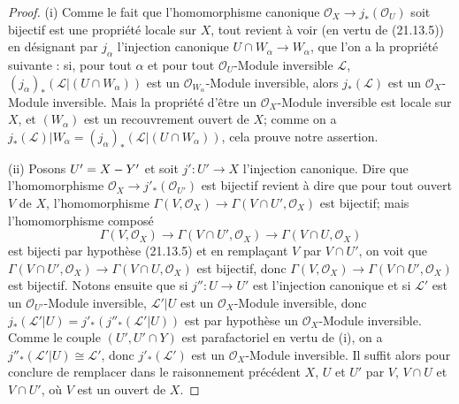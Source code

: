 \begin{proof}
(i) Comme le fait que l'homomorphisme canonique
$\mathcal O_X\to j_*(\mathcal O_U)$ soit bijectif est une propriété locale sur $X$,
tout revient à voir (en vertu de (21.13.5)) en désignant par
$j_\alpha$ l'injection canonique $U\cap W_\alpha\to W_\alpha$, que l'on a la propriété
suivante : si, pour tout $\alpha$ et pour tout $\mathcal O_U$-Module inversible
$\mathscr L$, $(j_\alpha)_*(\mathscr L|(U\cap W_\alpha))$ est un
$\mathcal O_{W_\alpha}$-Module inversible, alors $j_*(\mathscr L)$ est un
$\mathcal O_X$-Module inversible. Mais la propriété d'être un $\mathcal O_X$-Module
inversible est locale sur $X$, et $(W_\alpha)$ est un recouvrement ouvert de $X$;
comme on a
$j_*(\mathscr L)|W_\alpha=(j_\alpha)_*(\mathscr L|(U\cap W_\alpha))$, cela prouve notre assertion.

(ii) Posons $U'=X- Y'$ et soit $j':U'\to X$ l'injection canonique. Dire que
l'homomorphisme $\mathcal O_X\to j'_*(\mathcal O_{U'})$ est bijectif revient à dire
que pour tout ouvert $V$ de $X$, l'homomorphisme
$\Gamma(V,\mathcal O_X)\to\Gamma(V\cap U',\mathcal O_X)$ est bijectif; mais
l'homomorphisme composé
\[
  \Gamma(V,\mathcal O_X)\longrightarrow\Gamma(V\cap U',\mathcal O_X)
  \longrightarrow\Gamma(V\cap U,\mathcal O_X)
\]
est bijecti par hypothèse (21.13.5) et en remplaçant $V$ par $V\cap U'$, on voit que
$\Gamma(V\cap U',\mathcal O_X)\to\Gamma(V\cap U,\mathcal O_X)$ est bijectif, donc
$\Gamma(V,\mathcal O_X)\to\Gamma(V\cap U',\mathcal O_X)$ est bijectif. Notons ensuite
que si $j'':U\to U'$ est l'injection canonique et si $\mathscr L'$ est un
$\mathcal O_{U'}$-Module inversible, $\mathscr L'|U$ est un $\mathcal O_X$-Module
inversible, donc
$j_*(\mathscr L'|U)=j'_*(j''_*(\mathscr L'|U))$ est par hypothèse un
$\mathcal O_X$-Module inversible. Comme le couple $(U',U'\cap Y)$ est parafactoriel
en vertu de (i), on a $j''_*(\mathscr L'|U)\cong\mathscr L'$, donc
$j'_*(\mathscr L')$ est un $\mathcal O_X$-Module inversible. Il suffit alors pour
conclure de remplacer dans le raisonnement précédent $X$, $U$ et $U'$ par $V$,
$V\cap U$ et $V\cap U'$, où $V$ est un ouvert de $X$.


\end{proof}
